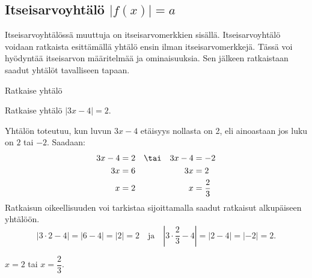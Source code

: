 \subsection*{Itseisarvoyhtälö $|f(x)|=a$}


Itseisarvoyhtälössä muuttuja on itseisarvomerkkien sisällä. Itseisarvoyhtälö voidaan ratkaista esittämällä yhtälö ensin ilman itseisarvomerkkejä. Tässä voi hyödyntää itseisarvon määritelmää ja ominaisuuksia. Sen jälkeen ratkaistaan saadut yhtälöt tavalliseen tapaan.


\begin{esimerkki}

Ratkaise yhtälö
\begin{alakohdat}
\end{alakohdat}

\begin{esimratk}
\begin{alakohdat}
\end{alakohdat}
\end{esimratk}
\end{esimerkki}

\begin{esimerkki}
Ratkaise yhtälö $|3x-4|=2$.

\begin{esimratk}
Yhtälön toteutuu, kun luvun $3x-4$ etäisyys nollasta on 2, eli ainoastaan jos luku on $2$ tai $-2$. Saadaan:
\begin{align*}
3x-4 & =2 & & \tai & 3x-4 & =-2 \\
3x & =6 && & 3x & = 2 \\
x & =2 && & x & =\frac{2}{3}
\end{align*}
Ratkaisun oikeellisuuden voi tarkistaa sijoittamalla saadut ratkaisut alkupäiseen yhtälöön.
\[
|3\cdot2-4|=|6-4|=|2|=2 \quad \text{ja} \quad
\left|3\cdot\frac{2}{3}-4\right|=|2-4|=|-2|=2.
\]
\end{esimratk}

\begin{esimvast}
$x=2$ tai $x=\dfrac{2}{3}$.
\end{esimvast}
\end{esimerkki}

